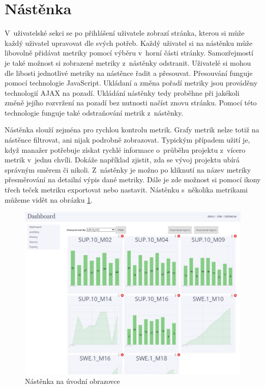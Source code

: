 \documentclass[czech,master]{diploma}
\begin{document}
\section{Nástěnka}
V~uživatelské sekci se po přihlášení uživatele zobrazí stránka, kterou si může každý uživatel upravovat dle svých potřeb. Každý uživatel si na nástěnku může libovolně přidávat metriky pomocí výběru v~horní části stránky. Samozřejmostí je také možnost si zobrazené metriky z~nástěnky odstranit. Uživatelé si mohou dle libosti jednotlivé metriky na nástěnce řadit a přesouvat. Přesouvání funguje pomocí technologie JavaScript. Ukládaní a změna pořadí metriky jsou prováděny technologií AJAX na pozadí. Ukládání nástěnky tedy proběhne při jakékoli změně jejího rozvržení na pozadí bez nutnosti načíst znovu stránku. Pomocí této technologie funguje také odstraňování metrik z~nástěnky.

Nástěnka slouží zejména pro rychlou kontrolu metrik. Grafy metrik nelze totiž na nástěnce filtrovat, ani nijak podrobně zobrazovat. Typickým případem užití je, když manažer potřebuje získat rychlé informace o~průběhu projektu z~vícero metrik v~jednu chvíli. Dokáže například zjistit, zda se vývoj projektu ubírá správným směrem či nikoli. Z~nástěnky je možno po kliknutí na název metriky přesměrování na detailní výpis dané metriky. Dále je zde možnost si pomocí ikony třech teček metriku exportovat nebo nastavit. Nástěnku s~několika metrikami můžeme vidět na obrázku \ref{fig:dashboard_metrics}.

\begin{figure}[!ht]
    \centering
    \includegraphics[width=1\textwidth]{Diplomka/Figures/dashboard_metrics.jpg}
    \caption{Nástěnka na úvodní obrazovce}
    \label{fig:dashboard_metrics}
\end{figure}
\end{document}
